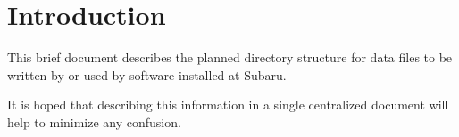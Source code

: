 \section{Introduction}

This brief document describes the planned directory structure for data files
to be written by or used by software installed at Subaru. 


It is hoped that describing this information 
in a single centralized document will help to minimize any confusion. 
    
